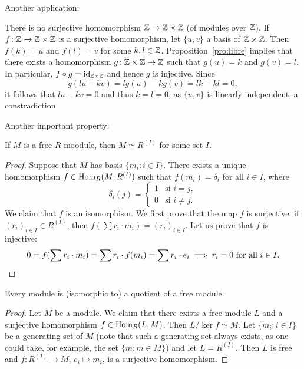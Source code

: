 Another application:

\begin{example}
There is no surjective homomorphism $\mathbb{Z}\to\mathbb{Z}\times\mathbb{Z}$ (of modules over $\mathbb{Z}$). 
If $f\colon\mathbb{Z}\to\mathbb{Z}\times\mathbb{Z}$ is a surjective homomorphism, 
let $\{u,v\}$ a basis of $\mathbb{Z}\times\mathbb{Z}$. Then $f(k)=u$ and $f(l)=v$ for some $k,l\in\mathbb{Z}$. Proposition~\ref{pro:libre} implies 
that there exists a homomorphism $g\colon\mathbb{Z}\times\mathbb{Z}\to\mathbb{Z}$ such that $g(u)=k$ and $g(v)=l$. 
In particular, $f\circ g=\operatorname{id}_{\mathbb{Z}\times\mathbb{Z}}$ and hence 
$g$ is injective. Since  
\[
g(lu-kv)=lg(u)-kg(v)=lk-kl=0,
\]
it follows that $lu-kv=0$ and thus $k=l=0$, as $\{u,v\}$ is linearly independent, a constradiction
\end{example}

Another important property:

\begin{proposition}
If $M$ is a free $R$-moodule, then $M\simeq R^{(I)}$ for some set $I$.
\end{proposition}

\begin{proof}
Suppose that $M$ has basis $\{m_i:i\in I\}$. There exists a unique homomorphism
$f\in\operatorname{Hom}_R(M,R^{(I)})$ such that  
$f(m_i)=\delta_i$ for all $i\in I$, where 
\[
\delta_i(j)=\begin{cases}
	1 & \text{si $i=j$},\\
	0 & \text{si $i\ne j$.}
	\end{cases}	
\]	
We claim that $f$ is an isomorphism. We first prove that the map $f$ is surjective: if $(r_i)_{i\in I}\in R^{(I)}$, then
$f(\sum r_i\cdot m_i)=(r_i)_{i\in I}$. Let us prove that $f$ is injective: 
\[
0=f(\sum r_i\cdot m_i)=\sum r_i\cdot f(m_i)=\sum r_i\cdot e_i\implies r_i=0\text{ for all $i\in I$}.\qedhere
\]
\end{proof}

\begin{corollary}
Every module is (isomorphic to) a quotient of a free module.
\end{corollary}

\begin{proof}
Let $M$ be a module. We claim that there exists a free module $L$ and a surjective homomorphism $f\in\operatorname{Hom}_R(L,M)$. Then
$L/\ker f\simeq M$. Let $\{m_i:i\in I\}$
be a generating set of $M$ (note that such a generating set always exists, as one could take, for example, the set
$\{m:m\in M\}$) and let $L=R^{(I)}$. Then $L$ is free and $f\colon R^{(I)}\to M$, $e_i\mapsto m_i$, is a surjective 
homomorphism.
\end{proof}

